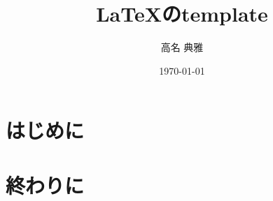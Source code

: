 \documentclass[12pt,a4paper,dvipdfmx]{jsreport}
\title{\LaTeX のtemplate}
\author{高名 典雅}
\date{\today}
\begin{document}


\chapter{はじめに}

\chapter{終わりに}
\end{document}
